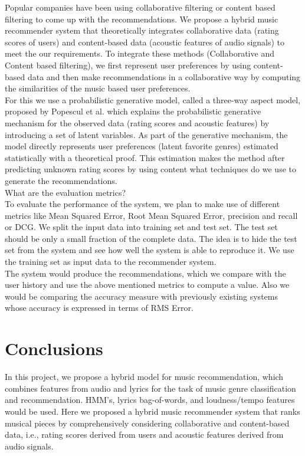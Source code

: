 \documentclass{sig-alternate-05-2015}
\begin{document}
Popular companies have been using collaborative filtering or content based filtering to come up with the recommendations. We propose a hybrid music recommender system that theoretically integrates collaborative data (rating scores of users) and content-based data (acoustic features of audio signals) to meet the our requirements. To integrate these methods (Collaborative and Content based filtering), we first represent user preferences by using content-based data and then make recommendations in a collaborative way by computing the similarities of the music based user preferences.\\

For this we use a probabilistic generative model, called a three-way aspect model, proposed by Popescul et al. which explains the probabilistic generative mechanism for the observed data (rating scores and acoustic features) by introducing a set of latent variables. As part of the generative mechanism, the model directly represents user preferences (latent favorite genres) estimated statistically with a theoretical proof. This estimation makes the method after predicting unknown rating scores by using content what techniques do we use to generate the recommendations.\\

What are the evaluation metrics? \\

To evaluate the performance of the system, we plan to make use of different metrics like Mean Squared Error, Root Mean Squared Error, precision and recall or DCG. We split the input data into training set and test set. The test set should be only a small fraction of the complete data. The idea is to hide the test set from the system and see how well the system is able to reproduce it. We use the training set as input data to the recommender system.\\

The system would produce the recommendations, which we compare with the user history and use the above mentioned metrics to compute a value. Also we would be comparing the accuracy measure with previously existing systems whose accuracy is expressed in terms of RMS Error.


\section{Conclusions}

In this project, we propose a hybrid model for music recommendation, which combines features from audio and lyrics for the task of music genre classification and recommendation. HMM's, lyrics bag-of-words, and loudness/tempo features would be used. Here we proposed a hybrid music recommender system that ranks musical pieces by comprehensively considering collaborative and content-based data, i.e., rating scores derived from users and acoustic features derived from audio signals.\\
\end{document}
